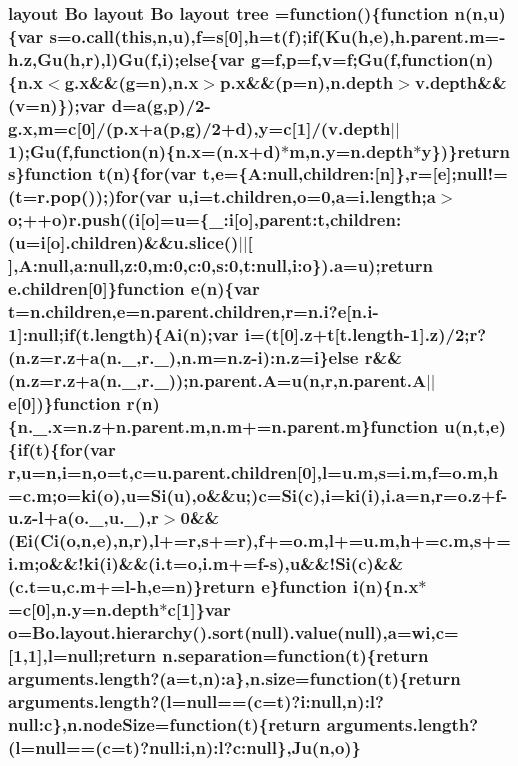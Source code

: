 \subsubsection[{tree}]{ {\bf layout} {\bf Bo} {\bf layout} {\bf Bo} {\bf layout} tree =function()\{function {\bf n}({\bf n},u)\{var s={\bf o.\+call}({\bf this},{\bf n},u),{\bf f}=s[0],h=t({\bf f});{\bf if}({\bf Ku}(h,{\bf e}),h.\+parent.\+m=-\/h.\+z,{\bf Gu}(h,{\bf r}),l){\bf Gu}({\bf f},{\bf i});{\bf else}\{var g={\bf f},p={\bf f},v={\bf f};{\bf Gu}({\bf f},function({\bf n})\{{\bf n.\+x}$<${\bf g.\+x}\&\&(g={\bf n}),{\bf n.\+x}$>${\bf p.\+x}\&\&(p={\bf n}),n.\+depth$>$v.\+depth\&\&(v={\bf n})\});var {\bf d}={\bf a}(g,p)/2-\/{\bf g.\+x},m={\bf c}[0]/({\bf p.\+x}+{\bf a}(p,g)/2+{\bf d}),y={\bf c}[1]/(v.\+depth$\vert$$\vert$1);{\bf Gu}({\bf f},function({\bf n})\{{\bf n.\+x}=({\bf n.\+x}+{\bf d})$\ast$m,n.\+y=n.\+depth$\ast$y\})\}{\bf return} s\}function t({\bf n})\{{\bf for}(var t,{\bf e}=\{A\+:null,children\+:[{\bf n}]\},{\bf r}=[{\bf e}];null!=(t=r.\+pop());){\bf for}(var u,{\bf i}=t.\+children,{\bf o}=0,{\bf a}=i.\+length;{\bf a}$>${\bf o};++{\bf o})r.\+push(({\bf i}[{\bf o}]=u=\{\+\_\+\+:i[{\bf o}],parent\+:t,children\+:(u={\bf i}[{\bf o}].children)\&\&u.\+slice()$\vert$$\vert$[$\,$],A\+:null,a\+:null,z\+:0,m\+:0,c\+:0,s\+:0,t\+:null,i\+:o\}).{\bf a}=u);{\bf return} e.\+children[0]\}function {\bf e}({\bf n})\{var t=n.\+children,{\bf e}=n.\+parent.\+children,{\bf r}={\bf n.\+i}?{\bf e}[{\bf n.\+i}-\/1]\+:null;{\bf if}(t.\+length)\{{\bf Ai}({\bf n});var {\bf i}=(t[0].z+t[t.\+length-\/1].z)/2;{\bf r}?(n.\+z=r.\+z+{\bf a}(n.\+\_\+,r.\+\_\+),n.\+m=n.\+z-\/{\bf i})\+:n.\+z={\bf i}\}{\bf else} {\bf r}\&\&(n.\+z=r.\+z+{\bf a}(n.\+\_\+,r.\+\_\+));n.\+parent.\+A=u({\bf n},{\bf r},n.\+parent.\+A$\vert$$\vert${\bf e}[0])\}function {\bf r}({\bf n})\{{\bf n.\+\_\+.\+x}=n.\+z+n.\+parent.\+m,n.\+m+=n.\+parent.\+m\}function u({\bf n},t,{\bf e})\{{\bf if}(t)\{{\bf for}(var {\bf r},u={\bf n},{\bf i}={\bf n},{\bf o}=t,{\bf c}=u.\+parent.\+children[0],l=u.\+m,s={\bf i.\+m},{\bf f}=o.\+m,h={\bf c.\+m};{\bf o}={\bf ki}({\bf o}),u={\bf Si}(u),{\bf o}\&\&u;){\bf c}={\bf Si}({\bf c}),{\bf i}={\bf ki}({\bf i}),{\bf i.\+a}={\bf n},{\bf r}=o.\+z+{\bf f}-\/u.\+z-\/l+{\bf a}(o.\+\_\+,u.\+\_\+),{\bf r}$>$0\&\&({\bf Ei}({\bf Ci}({\bf o},{\bf n},{\bf e}),{\bf n},{\bf r}),l+={\bf r},s+={\bf r}),{\bf f}+=o.\+m,l+=u.\+m,h+={\bf c.\+m},s+={\bf i.\+m};{\bf o}\&\&!{\bf ki}({\bf i})\&\&(i.\+t={\bf o},{\bf i.\+m}+={\bf f}-\/s),u\&\&!{\bf Si}({\bf c})\&\&(c.\+t=u,{\bf c.\+m}+=l-\/h,{\bf e}={\bf n})\}{\bf return} {\bf e}\}function {\bf i}({\bf n})\{{\bf n.\+x}$\ast$={\bf c}[0],n.\+y=n.\+depth$\ast${\bf c}[1]\}var {\bf o}={\bf Bo.\+layout.\+hierarchy}().{\bf sort}(null).value(null),{\bf a}={\bf wi},{\bf c}=[1,1],l=null;{\bf return} n.\+separation=function(t)\{{\bf return} arguments.\+length?({\bf a}=t,{\bf n})\+:{\bf a}\},{\bf n.\+size}=function(t)\{{\bf return} arguments.\+length?(l=null==({\bf c}=t)?i\+:null,{\bf n})\+:l?null\+:c\},n.\+node\+Size=function(t)\{{\bf return} arguments.\+length?(l=null==({\bf c}=t)?null\+:i,{\bf n})\+:l?c\+:null\},{\bf Ju}({\bf n},{\bf o})\}}\label{d3_8min_8js_a5fb5a9b9980e6103469195c4d9b7bbf2}


